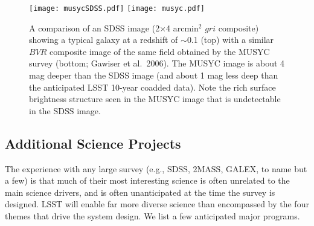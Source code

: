 \begin{figure}
\vskip -1in
\texttt{[image: musycSDSS.pdf]}
\vskip -1.9in
\texttt{[image: musyc.pdf]}
\vskip -1in
\caption{
A comparison of an SDSS image (2$\times$4 arcmin$^2$ $gri$ composite) showing a typical galaxy at 
a redshift of $\sim$0.1 (top) with a similar $BVR$ composite image of the same field obtained by the MUSYC survey (bottom; 
Gawiser et al.~2006). The MUSYC image is about 4 mag deeper than the SDSS image (and about 1 mag less deep 
than the anticipated LSST 10-year coadded data). Note the rich surface brightness structure seen in the MUSYC 
image that is undetectable in the SDSS image.} 
\label{Fig:musyc}
\end{figure}


\subsection{  Additional Science Projects}

The experience with any large survey (e.g., SDSS, 2MASS, GALEX, to name but a 
few) is that much of their most interesting science is often unrelated to 
the main science drivers, and is often unanticipated at the time the survey is 
designed. LSST will enable far more diverse science than encompassed by the 
four themes that drive the system design. We list a few anticipated major 
programs.


